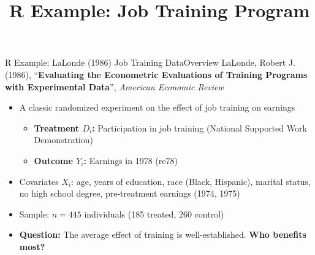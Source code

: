 \documentclass[hyperref={pdfpagelabels=false}]{beamer}
\begin{document}
\title[]
{R Example: Job Training Program}

\author{}
\institute{}
\date{}

\begin{frame}{}
	\titlepage
\end{frame}




\begin{frame}{R Example: LaLonde (1986) Job Training Data}{Overview}
	LaLonde, Robert J. (1986), ``\textbf{Evaluating the Econometric Evaluations of Training Programs with Experimental Data}'', \textit{American Economic Review}

	\vspace{0.2cm}
	\begin{itemize}
		\item A classic randomized experiment on the effect of job training on earnings
		\vspace{0.2cm}
		\begin{itemize}
			\item \textbf{Treatment $D_i$:} Participation in job training (National Supported Work Demonstration)
			\vspace{0.2cm}
			\item \textbf{Outcome $Y_i$:} Earnings in 1978 (re78)
		\end{itemize}
		\vspace{0.2cm}
		\item Covariates $X_i$: age, years of education, race (Black, Hispanic), marital status, no high school degree, pre-treatment earnings (1974, 1975)
		\vspace{0.2cm}
		\item Sample: $n = 445$ individuals (185 treated, 260 control)
		\vspace{0.2cm}
		\item \textbf{Question:} The average effect of training is well-established. \textbf{Who benefits most?}
	\end{itemize}
\end{frame}
\end{document}
